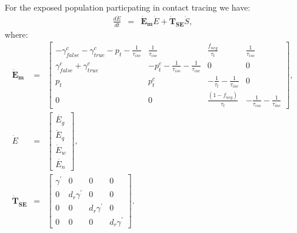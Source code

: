 \documentclass[notitlepage, superscriptaddress]{revtex4-2}
\begin{document}
For the exposed population particpating in contact tracing we have:
\begin{eqnarray}
\frac{d\dot{E}}{dt} &=& \boldsymbol{\dot{E}_{m}}  \dot{E} + \boldsymbol{\dot{T}_{\dot{S}\dot{E}}}  \dot{S}, 
\end{eqnarray}
where:
\begin{eqnarray}
\boldsymbol{\dot{E}_{m}} &=&
\begin{bmatrix}
 -\gamma^{c}_{false} -\gamma^{c}_{true} - p_{t} -\frac{1}{\tau_{inc}} & \frac{1}{\tau_{iso}}  & \frac{f_{neg}}{\tau_{t}} & \frac{1}{\tau_{iso}} \\
\gamma^{c}_{false} + \gamma^{c}_{true}    &  -p^{c}_{t}  - \frac{1}{\tau_{iso}} - \frac{1}{\tau_{inc}}      &  0    & 0  \\
p_{t}     &  p^{c}_{t}                  &  -\frac{1}{\tau_{t}}  - \frac{1}{\tau_{inc}}  & 0 \\
0 & 0 & \frac{(1-f_{neg})}{\tau_{t}}  & -\frac{1}{\tau_{iso}}  -  \frac{1}{\tau_{inc}} 
\end{bmatrix}, \\ 
%
\dot{E} &=& 
\begin{bmatrix}
\dot{E_{g}} \\ \dot{E}_{q} \\ \dot{E}_{w}\\ \dot{E_{n}}
\end{bmatrix}, \\ 
%
\boldsymbol{\dot{T}_{\dot{S}\dot{E}}} &=&
\begin{bmatrix}
\gamma^{'}  & 0                 & 0                 & 0 \\ 
 0          & d_{r} \gamma^{'}  & 0                 & 0 \\ 
 0          & 0                 & d_{r} \gamma^{'}  & 0  \\
 0          & 0                 & 0                 & d_{r} \gamma^{'}
\end{bmatrix}.
\end{eqnarray}

\end{document}
